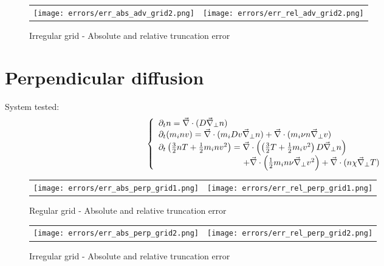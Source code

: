 \documentclass[a4paper,11pts]{report}
\begin{document}
  \begin{figure}[!h]
    \centering
    \begin{tabular}{cc}
      \hspace{-1.5cm}      \texttt{[image: errors/err\_abs\_adv\_grid2.png]} &
      \texttt{[image: errors/err\_rel\_adv\_grid2.png]}
    \end{tabular}
\caption{Irregular grid - Absolute and relative truncation error}
  \end{figure}

\newpage

\chapter*{Perpendicular diffusion}

System tested:
\begin{equation*}
  \left\{
  \begin{array}{l}
    \partial_t n  =  \vec{\nabla} \cdot (D \vec{\nabla}_\perp n) \\
    \partial_t (m_i n v) = \vec{\nabla} \cdot (m_i D v \vec{\nabla}_\perp n) + \vec{\nabla} \cdot (m_i \nu n \vec{\nabla}_\perp v) \\
    \partial_t \left( \frac{3}{2} n T + \frac{1}{2} m_i n v^2 \right)  =  \vec{\nabla} \cdot \left( \left(\frac{3}{2} T + \frac{1}{2} m_i v^2 \right) D  \vec{\nabla}_\perp n \right) \\
\hspace{3.5cm} + \vec{\nabla}\cdot\left( \frac{1}{2}m_i n \nu \vec{\nabla}_\perp v^2 \right) + \vec{\nabla} \cdot (n \chi \vec{\nabla}_\perp T)
  \end{array} \right.
\end{equation*}


  \begin{figure}[!h]
    \centering
    \begin{tabular}{cc}
  \hspace{-1.5cm}      \texttt{[image: errors/err\_abs\_perp\_grid1.png]} &
      \texttt{[image: errors/err\_rel\_perp\_grid1.png]}
    \end{tabular}
\caption{Regular grid - Absolute and relative truncation error}
  \end{figure}

  \begin{figure}[!h]
    \centering
    \begin{tabular}{cc}
      \hspace{-1.5cm}      \texttt{[image: errors/err\_abs\_perp\_grid2.png]} &
      \texttt{[image: errors/err\_rel\_perp\_grid2.png]}
    \end{tabular}
\caption{Irregular grid - Absolute and relative truncation error}
  \end{figure}
\end{document}
